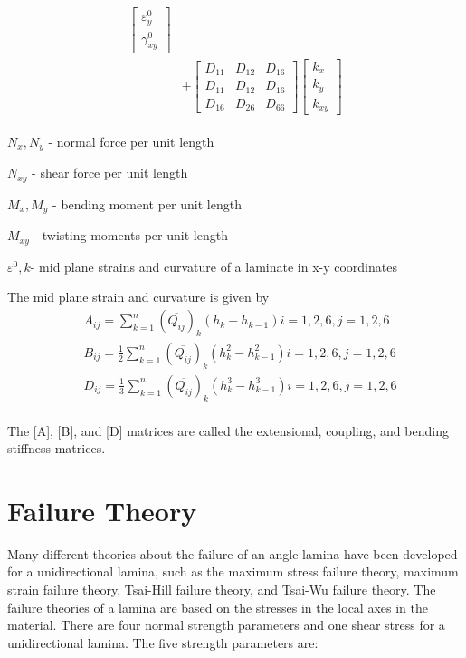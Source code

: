 \documentclass[USenglish,twocolumn]{article}
\begin{document}
\begin{equation}
\begin{array}{l}
\begin{aligned}
\begin{bmatrix}
        \varepsilon_y^0 \\
		\gamma_{xy}^0
    \end{bmatrix} \\ 
	&+  
	\begin{bmatrix}
		D_{11} & D_{12} & D_{16} \\
		D_{11} & D_{12} & D_{16} \\
		D_{16} & D_{26} & D_{66} 
	\end{bmatrix}
	\begin{bmatrix}
		k_x \\
		k_y \\
		k_{xy} 
	\end{bmatrix}
\end{aligned}
	\end{array}
\end{equation}


$N_x,N_y $  - normal force per unit length

$N_{xy} $  - shear force per unit length

$M_x, M_y $ - bending moment per unit length

$M_{xy} $  - twisting moments per unit length

$\varepsilon^{0}, k $- mid plane strains and curvature of a laminate in x-y coordinates

The mid plane strain and curvature is given by
\begin{equation}
    \begin{split}
    &A_{ij}=\sum_{k=1}^{n}(\overline{Q_{ij}})_k(h_k-h_{k-1})  i=1,2,6, j=1,2,6\\
    &B_{ij}=\frac{1}{2}\sum_{k=1}^{n}(\overline{Q_{ij}})_k(h^2_k - h_{k-1}^2)  i=1,2,6, j=1,2,6\\
    &D_{ij}=\frac{1}{3}\sum_{k=1}^{n}(\overline{Q_{ij}})_k(h^3_k - h_{k-1}^3) i=1,2,6, j=1,2,6\\
    \end{split}
\end{equation}

The [A], [B], and [D] matrices are called the extensional, coupling, and bending stiffness matrices.


\section{Failure Theory}
Many different theories about the failure of an angle lamina have been developed for a
unidirectional lamina, such as the maximum stress failure theory, maximum strain failure theory,
Tsai-Hill failure theory, and Tsai-Wu failure theory. The failure theories of a lamina are based on
the stresses in the local axes in the material. There are four normal strength parameters and one shear
stress for a unidirectional lamina. The five strength parameters are:
\end{document}

